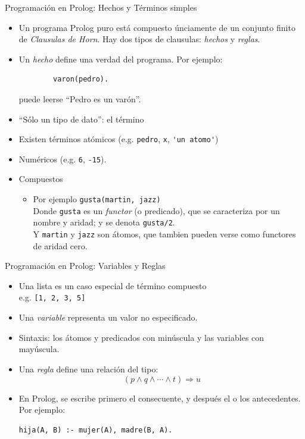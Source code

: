 \documentclass[xcolor=dvipsnames]{beamer}
\begin{document}
\begin{frame}[fragile]{Programación en Prolog: Hechos y Términos simples}

    \begin{itemize}
        \item Un programa Prolog puro está compuesto únciamente de un conjunto finito de \textit{Clausulas de Horn}. Hay dos tipos de clausulas: \textit{hechos} y \textit{reglas}.
        \item Un \textit{hecho} define una verdad del programa. Por ejemplo:
        \begin{lstlisting}
        varon(pedro).
        \end{lstlisting}
        puede leerse ``Pedro es un varón''.
        \item ``Sólo un tipo de dato'': el término
        \item Existen términos atómicos (e.g. \verb|pedro|, \verb|x|, \verb|'un atomo'|)
        \item Numéricos (e.g. \verb|6|, \verb|-15|).
        \item Compuestos
        \begin{itemize}
            \item Por ejemplo \verb|gusta(martin, jazz)| \\
            Donde \verb|gusta| es un \textit{functor} (o predicado), que se caracteriza por un nombre y aridad; y se denota \verb|gusta/2|. \\
            Y \verb|martin| y \verb|jazz| son átomos, que tambien pueden verse como functores de aridad cero.
        \end{itemize} 
    \end{itemize} 

\end{frame}

\begin{frame}[fragile]{Programación en Prolog: Variables y Reglas}
    \begin{itemize}
        \item Una lista es un caso especial de término compuesto \\
        e.g. \verb|[1, 2, 3, 5]|
        \item Una \textit{variable} representa un valor no especificado.
        \item Sintaxis: los átomos y predicados con minúscula y las variables con mayúscula.
        \item Una \textit{regla} define una relación del tipo: 
        \[
        (p \wedge q \wedge \cdots \wedge t) \Rightarrow u
        \]
        \item En Prolog, se escribe primero el consecuente, y después el o los antecedentes. Por ejemplo:
        \begin{lstlisting}
hija(A, B) :- mujer(A), madre(B, A).
        \end{lstlisting}
    \end{itemize}
\end{frame}
\end{document}
